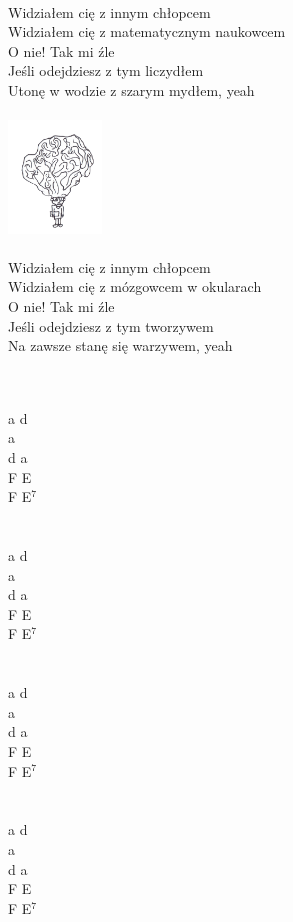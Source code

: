 \documentclass[a5paper, 10pt]{book}
\begin{document}
\begin{minipage}[t]{0.9\textwidth}
\\
Widziałem cię z innym chłopcem\\
Widziałem cię z matematycznym naukowcem\\
O nie! Tak mi źle\\
Jeśli odejdziesz z tym liczydłem\\
Utonę w wodzie z szarym mydłem, yeah\\
\\
\includegraphics[height=3cm, right]{widzialem_cie_4.png}\vspace*{-3.1cm}\\
\\
Widziałem cię z innym chłopcem\\
Widziałem cię z mózgowcem w okularach\\
O nie! Tak mi źle\\
Jeśli odejdziesz z tym tworzywem\\
Na zawsze stanę się warzywem, yeah\\
\end{minipage}
\begin{minipage}[t]{0.1\textwidth}
~\\
\\
a d\\
a\\
d a\\
F E\\
F E$^7$\\
\\
\\
a d\\
a\\
d a\\
F E\\
F E$^7$\\
\\
\\
a d\\
a\\
d a\\
F E\\
F E$^7$\\
\\
\\
a d\\
a\\
d a\\
F E\\
F E$^7$\\
\end{minipage}
\end{document}
